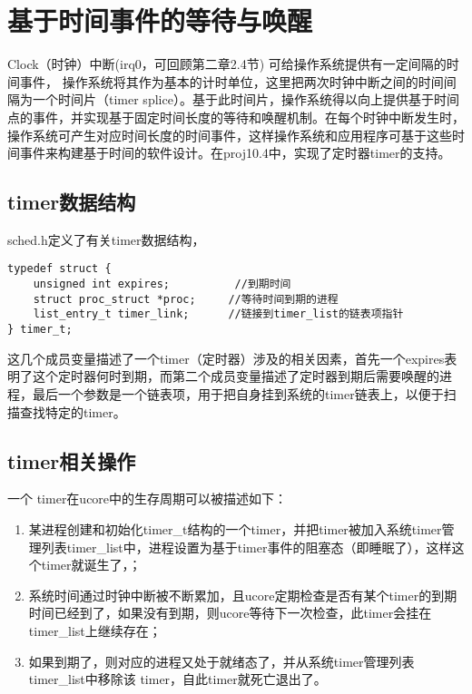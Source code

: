 \section{基于时间事件的等待与唤醒}\label{ux57faux4e8eux65f6ux95f4ux4e8bux4ef6ux7684ux7b49ux5f85ux4e0eux5524ux9192}

Clock（时钟）中断(irq0，可回顾第二章2.4节)
可给操作系统提供有一定间隔的时间事件，
操作系统将其作为基本的计时单位，这里把两次时钟中断之间的时间间隔为一个时间片（timer
splice）。基于此时间片，操作系统得以向上提供基于时间点的事件，并实现基于固定时间长度的等待和唤醒机制。在每个时钟中断发生时，操作系统可产生对应时间长度的时间事件，这样操作系统和应用程序可基于这些时间事件来构建基于时间的软件设计。在proj10.4中，实现了定时器timer的支持。

\subsection{timer数据结构}\label{timerux6570ux636eux7ed3ux6784}

sched.h定义了有关timer数据结构，

\begin{lstlisting}
typedef struct {
    unsigned int expires;          //到期时间
    struct proc_struct *proc;     //等待时间到期的进程
    list_entry_t timer_link;      //链接到timer_list的链表项指针
} timer_t;
\end{lstlisting}

这几个成员变量描述了一个timer（定时器）涉及的相关因素，首先一个expires表明了这个定时器何时到期，而第二个成员变量描述了定时器到期后需要唤醒的进程，最后一个参数是一个链表项，用于把自身挂到系统的timer链表上，以便于扫描查找特定的timer。

\subsection{timer相关操作}\label{timerux76f8ux5173ux64cdux4f5c}

一个 timer在ucore中的生存周期可以被描述如下：

\begin{enumerate}
\def\labelenumi{\arabic{enumi}.}
\item
  某进程创建和初始化timer\_t结构的一个timer，并把timer被加入系统timer管理列表timer\_list中，进程设置为基于timer事件的阻塞态（即睡眠了），这样这个timer就诞生了，；
\item
  系统时间通过时钟中断被不断累加，且ucore定期检查是否有某个timer的到期时间已经到了，如果没有到期，则ucore等待下一次检查，此timer会挂在timer\_list上继续存在；
\item
  如果到期了，则对应的进程又处于就绪态了，并从系统timer管理列表timer\_list中移除该
  timer，自此timer就死亡退出了。
\end{enumerate}

